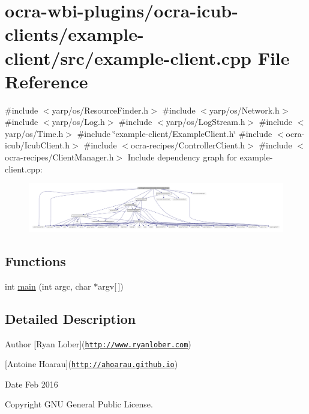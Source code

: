 \hypertarget{example-client_8cpp}{\section{ocra-\/wbi-\/plugins/ocra-\/icub-\/clients/example-\/client/src/example-\/client.cpp \-File \-Reference}
\label{example-client_8cpp}
}
{\ttfamily \#include $<$yarp/os/\-Resource\-Finder.\-h$>$}\*
{\ttfamily \#include $<$yarp/os/\-Network.\-h$>$}\*
{\ttfamily \#include $<$yarp/os/\-Log.\-h$>$}\*
{\ttfamily \#include $<$yarp/os/\-Log\-Stream.\-h$>$}\*
{\ttfamily \#include $<$yarp/os/\-Time.\-h$>$}\*
{\ttfamily \#include \char`\"{}example-\/client/\-Example\-Client.\-h\char`\"{}}\*
{\ttfamily \#include $<$ocra-\/icub/\-Icub\-Client.\-h$>$}\*
{\ttfamily \#include $<$ocra-\/recipes/\-Controller\-Client.\-h$>$}\*
{\ttfamily \#include $<$ocra-\/recipes/\-Client\-Manager.\-h$>$}\*
\-Include dependency graph for example-\/client.cpp\-:\nopagebreak
\begin{figure}[H]
\begin{center}
\leavevmode
\includegraphics[width=350pt]{example-client_8cpp__incl}
\end{center}
\end{figure}
\subsection*{\-Functions}
\begin{DoxyCompactItemize}
\item 
int \hyperlink{example-client_8cpp_a0ddf1224851353fc92bfbff6f499fa97}{main} (int argc, char $\ast$argv\mbox{[}$\,$\mbox{]})
\end{DoxyCompactItemize}


\subsection{\-Detailed \-Description}
\begin{DoxyAuthor}{\-Author}
\mbox{[}\-Ryan \-Lober\mbox{]}(\href{http://www.ryanlober.com}{\tt http\-://www.\-ryanlober.\-com}) 

\mbox{[}\-Antoine \-Hoarau\mbox{]}(\href{http://ahoarau.github.io}{\tt http\-://ahoarau.\-github.\-io}) 
\end{DoxyAuthor}
\begin{DoxyDate}{\-Date}
\-Feb 2016 
\end{DoxyDate}
\begin{DoxyCopyright}{\-Copyright}
\-G\-N\-U \-General \-Public \-License. 
\end{DoxyCopyright}


